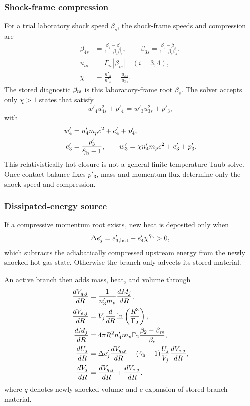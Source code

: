 \documentclass[twocolumn]{aastex702}
\begin{document}
\subsubsection{Shock-frame compression}

For a trial laboratory shock speed \(\beta_s\), the shock-frame speeds and
compression are
\begin{equation}
\begin{aligned}
\beta_{4s}&=\frac{\beta_4-\beta_s}{1-\beta_4\beta_s},
\qquad
\beta_{3s}=\frac{\beta_c-\beta_s}{1-\beta_c\beta_s},\\
u_{is}&=\Gamma_{is}|\beta_{is}|\quad (i=3,4),\\
\chi&\equiv\frac{n'_3}{n'_4}=\frac{u_{4s}}{u_{3s}} .
\end{aligned}
\end{equation}
The stored diagnostic \(\beta_{\rm rs}\) is this laboratory-frame root
\(\beta_s\).  The solver accepts only \(\chi>1\) states that satisfy
\begin{equation}
w'_4u_{4s}^2+p'_4=w'_3u_{3s}^2+p'_3,
\end{equation}
with
\begin{equation}
\begin{aligned}
w'_4&=n'_4m_pc^2+e'_4+p'_4,\\
e'_3&=\frac{p'_3}{\hat\gamma_{\rm h}-1},
\qquad
w'_3=\chi n'_4m_pc^2+e'_3+p'_3 .
\end{aligned}
\end{equation}
This relativistically hot closure is not a general finite-temperature Taub solve.
Once contact balance fixes \(p'_3\), mass and momentum flux determine only the
shock speed and compression.

\subsubsection{Dissipated-energy source}

If a compressive momentum root exists, new heat is deposited only when
\begin{equation}
\Delta e'_j=e'_{3,{\rm hot}}-e'_4\chi^{\hat\gamma_{\rm h}}>0,
\end{equation}
which subtracts the adiabatically compressed upstream energy from the newly
shocked hot-gas state.  Otherwise the branch only advects its stored material.

An active branch then adds mass, heat, and volume through
\begin{equation}
\begin{aligned}
\frac{dV_{q,j}}{dR}&=\frac{1}{n'_3m_p}\frac{dM_j}{dR},\\
\frac{dV_{e,j}}{dR}
&=V_j\frac{d}{dR}\ln\left(\frac{R^3}{\Gamma_2}\right),\\
\frac{dM_j}{dR}
&=4\pi R^2n'_4m_p\Gamma_2
\frac{\beta_2-\beta_{\rm rs}}{\beta_c},\\
\frac{dU_j}{dR}
&=\Delta e'_j\frac{dV_{q,j}}{dR}
-(\hat\gamma_{\rm h}-1)\frac{U_j}{V_j}
\frac{dV_{e,j}}{dR},\\
\frac{dV_j}{dR}
&=\frac{dV_{q,j}}{dR}+\frac{dV_{e,j}}{dR}.
\end{aligned}
\end{equation}
where \(q\) denotes newly shocked volume and \(e\) expansion of stored branch
material.
\end{document}
